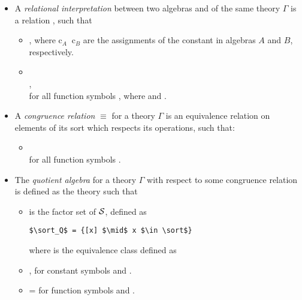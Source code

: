 \begin{itemize}
    \item A \emph{relational interpretation} between two algebras  and  of the same theory $\Gamma$ is a relation , such that 
    \begin{itemize}
    \item {}, where c$_A\ $ c$_B$ are the assignments of the constant  in algebras $A$ and $B$, respectively.  
    \item {} \\
    , \\
    for all function symbols , where  and . 
    \end{itemize}
    \item A \emph{congruence relation} $\equiv$ for a theory $\Gamma$ is an equivalence relation on elements of its sort which respects its operations, such that: 
    \begin{itemize}
    \item {}  \\
    for all function symbols . 
    \end{itemize}
    \item The \emph{quotient algebra} for a theory $\Gamma$ with respect to some congruence relation \lstmath{$\equiv$} is defined as the theory  such that 
    \begin{itemize}
       \item {} is the factor set of $\mathcal{S}$, defined as 
       	\begin{lstlisting}[mathescape]
       	$\sort_Q$ = {[x] $\mid$ x $\in \sort$}
       	\end{lstlisting} 
       	where \lstmath{[x]} is the equivalence class defined as 
       \item {}, for constant symbols  and .  
       \item {} = \lstmath{[f x$_1$ $\;...\;$ x$_n$]}
       for function symbols  and .
    \end{itemize}      


\end{itemize}
